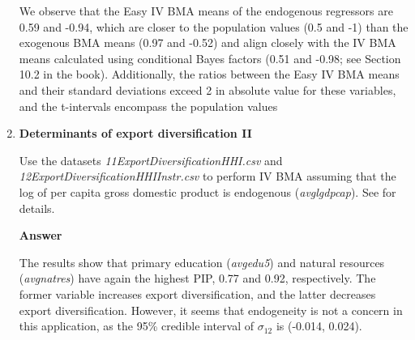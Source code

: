 \begin{enumerate}[leftmargin=*]
We observe that the Easy IV BMA means of the endogenous regressors are 0.59 and -0.94, which are closer to the population values (0.5 and -1) than the exogenous BMA means (0.97 and -0.52) and align closely with the IV BMA means calculated using conditional Bayes factors (0.51 and -0.98; see Section 10.2 in the book). Additionally, the ratios between the Easy IV BMA means and their standard deviations exceed 2 in absolute value for these variables, and the t-intervals encompass the population values   

\item \textbf{Determinants of export diversification II}

Use the datasets \textit{11ExportDiversificationHHI.csv} and \textit{12ExportDiversificationHHIInstr.csv} to perform IV BMA assuming that the log of per capita gross domestic product is endogenous (\textit{avglgdpcap}). See \cite{Jetter2015} for details.  

\textbf{Answer}

The results show that primary education (\textit{avgedu5}) and natural resources (\textit{avgnatres}) have again the highest PIP, 0.77 and 0.92, respectively. The former variable increases export diversification, and the latter decreases export diversification. However, it seems that endogeneity is not a concern in this application, as the 95\% credible interval of $\sigma_{12}$ is (-0.014, 0.024).   



\end{enumerate}
